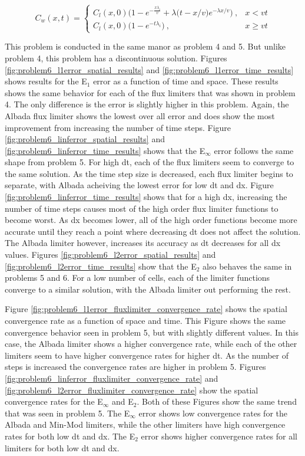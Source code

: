 \begin{equation}
C_{w} (x,t) = \begin{cases}
  C_{l} (x, 0) \Big( 1 - e^{-\frac{x \lambda _i}{v}} + \lambda \big(t - x/v\big)e^{-\lambda x/v} \Big)\ , & x < vt \\
  C_{l} (x, 0) \Big( 1 - e^{-t \lambda _i}\Big)\ , & x \ge vt
\end{cases}
\end{equation}

This problem is conducted in the same manor as problem 4 and 5. But unlike problem 4, this problem has a discontinuous solution. Figures \ref{fig:problem6_l1error_spatial_results} and  \ref{fig:problem6_l1error_time_results} shows results for the E${}_{1}$ error as a function of time and space. These results shows the same behavior for each of the flux limiters that was shown in problem 4. The only difference is the error is slightly higher in this problem. Again, the Albada flux limiter shows the lowest over all error and does show the most improvement from increasing the number of time steps. Figure \ref{fig:problem6_linferror_spatial_results} and \ref{fig:problem6_linferror_time_results} shows that the E${}_{\infty}$ error follows the same shape from problem 5. For high dt, each of the flux limiters seem to converge to the same solution. As the time step size is decreased, each flux limiter begins to separate, with Albada acheiving the lowest error for low dt and dx. Figure \ref{fig:problem6_linferror_time_results} shows that for a high dx, increasing the number of time steps causes most of the high order flux limiter functions to become worst. As dx becomes lower, all of the high order functions become more accurate until they reach a point where decreasing dt does not affect the solution. The Albada limiter however, increases its accuracy as dt decreases for all dx values. Figures \ref{fig:problem6_l2error_spatial_results} and \ref{fig:problem6_l2error_time_results} show that the E${}_{2}$ also behaves the same in problems 5 and 6. For a low number of cells, each of the limiter functions converge to a similar solution, with the Albada limiter out performing the rest. 

Figure \ref{fig:problem6_l1error_fluxlimiter_convergence_rate} shows the spatial convergence rate as a function of space and time. This Figure shows the same convergence behavior seen in problem 5, but with slightly different values. In this case, the Albada limiter shows a higher convergence rate, while each of the other limiters seem to have higher convergence rates for higher dt. As the number of steps is increased the convergence rates are higher in problem 5. Figures \ref{fig:problem6_linferror_fluxlimiter_convergence_rate} and \ref{fig:problem6_l2error_fluxlimiter_convergence_rate} show the spatial convergence rates for the E${}_{\infty}$ and E${}_{2}$. Both of these Figures show the same trend that was seen in problem 5. The E${}_{\infty}$ error shows low convergence rates for the Albada and Min-Mod limiters, while the other limiters have high convergence rates for both low dt and dx. The E${}_{2}$ error shows higher convergence rates for all limiters for both low dt and dx. 


